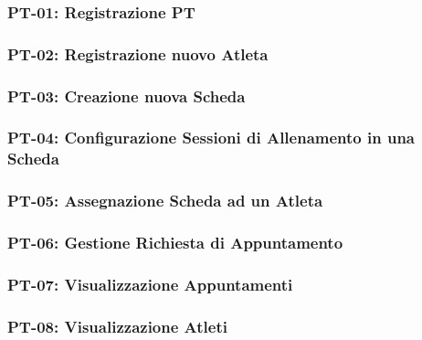 \subsubsection{PT-01: Registrazione PT}


\subsubsection{PT-02: Registrazione nuovo Atleta}


\subsubsection{PT-03: Creazione nuova Scheda}


\subsubsection{PT-04: Configurazione Sessioni di Allenamento in una Scheda}


\subsubsection{PT-05: Assegnazione Scheda ad un Atleta}


\subsubsection{PT-06: Gestione Richiesta di Appuntamento}


\subsubsection{PT-07: Visualizzazione Appuntamenti}


\subsubsection{PT-08: Visualizzazione Atleti}


